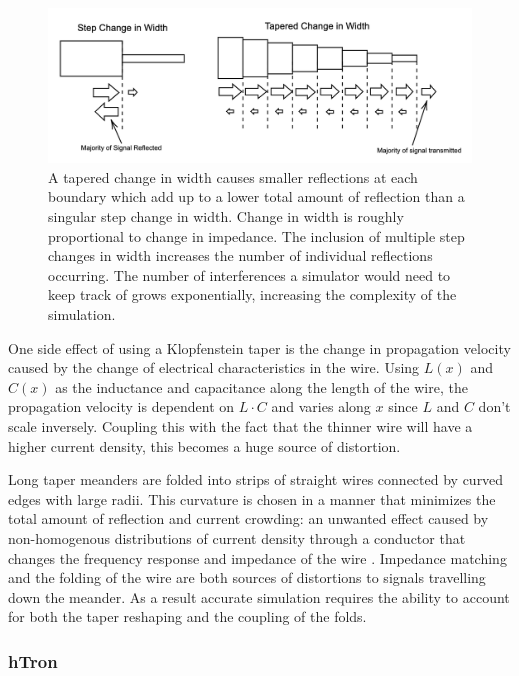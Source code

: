 \documentclass[]{article}
\begin{document}
\begin{figure}[h]
  \centering
  \includegraphics[width=5in]{figs/whatsataper.png}
  
  \caption{A tapered change in width causes smaller reflections at each boundary which add up to a lower total amount of reflection than a singular step change in width. Change in width is roughly proportional to change in impedance. The inclusion of multiple step changes in
  width increases the number of individual reflections occurring. 
  The number of interferences a simulator would need to keep track of grows 
  exponentially, increasing the complexity of the simulation.}
 \label{fig:whatsataper}
\end{figure}

One side effect of using a Klopfenstein taper is the change in propagation velocity 
caused by the change of electrical characteristics in the wire. Using $L(x)$ and $C(x)$ 
as the inductance and capacitance along the length of the wire, 
the propagation velocity is dependent on $L\cdot C$ and varies along $x$ since 
$L$ and $C$ don't scale inversely. Coupling this with the fact that the thinner wire will 
have a higher current density, this becomes a huge source of distortion.

Long taper meanders are folded into strips of straight wires connected by curved edges with 
large radii. This curvature is chosen in a manner that minimizes the total amount of reflection
and current crowding: an unwanted effect caused by non-homogenous distributions 
of current density through a conductor that changes the frequency response and impedance 
of the wire \cite{Akhlaghi:12}. Impedance matching and the folding of 
the wire are both sources of distortions
to signals travelling down the meander. As a result accurate simulation requires the ability to account for both the taper reshaping and the coupling of the folds.

\subsubsection{hTron}
\end{document}
